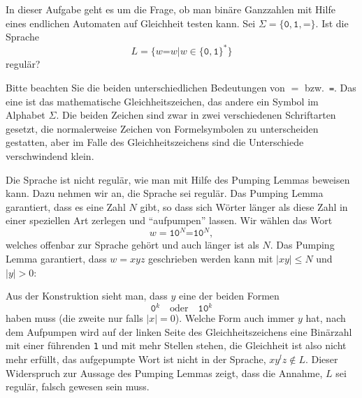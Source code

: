 In dieser Aufgabe geht es um die Frage, ob man binäre Ganzzahlen mit
Hilfe eines endlichen Automaten auf Gleichheit testen kann.
Sei $\Sigma=\{\texttt{0},\texttt{1},\texttt{=}\}$. Ist die Sprache
\[
L=\{ w\texttt{=}w|w\in \{\texttt{0},\texttt{1}\}^*\}
\]
regulär?


\begin{hinweis}
Bitte beachten Sie die beiden unterschiedlichen Bedeutungen von $=$
bzw.~\texttt{=}.
Das eine ist das mathematische Gleichheitszeichen, das andere ein Symbol
im Alphabet $\Sigma$.
Die beiden Zeichen sind zwar in zwei verschiedenen Schriftarten gesetzt,
die normalerweise Zeichen von Formelsymbolen zu unterscheiden gestatten,
aber im Falle des Gleichheitszeichens sind die Unterschiede verschwindend
klein.
\end{hinweis}

\begin{loesung}
Die Sprache ist nicht regulär, wie man mit Hilfe des Pumping
Lemmas beweisen kann.
Dazu nehmen wir an, die Sprache sei regulär.
Das Pumping Lemma garantiert, dass es eine Zahl $N$ gibt, so dass
sich Wörter länger als diese Zahl in einer speziellen Art
zerlegen und ``aufpumpen'' lassen.
Wir wählen das Wort
\[
w=\texttt{10}^N\texttt{=10}^N,
\]
welches offenbar zur Sprache gehört und auch länger ist als $N$.
Das Pumping Lemma garantiert, dass $w=xyz$  geschrieben werden kann
mit $|xy|\le N$ und $|y|>0$:
\begin{center}
\end{center}
Aus der Konstruktion sieht man, dass $y$ eine der beiden Formen
\[
\texttt{0}^k
\quad\text{oder}\quad
\texttt{10}^k
\]
haben muss (die zweite nur falls $|x|=0$).
Welche Form auch immer $y$ hat, nach dem Aufpumpen wird
auf der linken Seite des Gleichheitszeichens eine Binärzahl mit
einer führenden \texttt{1} und mit mehr Stellen stehen, die Gleichheit
ist also nicht mehr erfüllt, das aufgepumpte Wort ist nicht in der
Sprache, $xy^lz\not\in L$.
Dieser Widerspruch zur Aussage des Pumping
Lemmas zeigt, dass die Annahme, $L$ sei regulär, falsch gewesen
sein muss.
\end{loesung}


